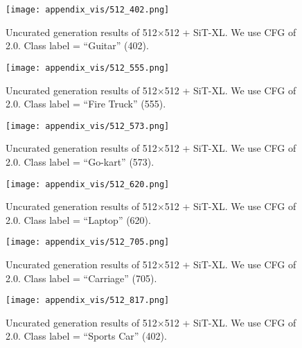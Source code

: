 \begin{figure}[h!]
    \centering
    \texttt{[image: appendix\_vis/512\_402.png]}
    \caption{Uncurated generation results of 512$\times$512 \method + SiT-XL. We use CFG of 2.0. Class label = ``Guitar'' (402).}
\end{figure}

\begin{figure}[h!]
    \centering
    \texttt{[image: appendix\_vis/512\_555.png]}
    \caption{Uncurated generation results of 512$\times$512 \method + SiT-XL. We use CFG of 2.0. Class label = ``Fire Truck'' (555).}
\end{figure}



\begin{figure}[h!]
    \centering
    \texttt{[image: appendix\_vis/512\_573.png]}
    \caption{Uncurated generation results of 512$\times$512 \method + SiT-XL. We use CFG of 2.0. Class label = ``Go-kart'' (573).}
\end{figure}


\begin{figure}[h!]
    \centering
    \texttt{[image: appendix\_vis/512\_620.png]}
    \caption{Uncurated generation results of 512$\times$512 \method + SiT-XL. We use CFG of 2.0. Class label = ``Laptop'' (620).}
\end{figure}


\begin{figure}[h!]
    \centering
    \texttt{[image: appendix\_vis/512\_705.png]}
    \caption{Uncurated generation results of 512$\times$512 \method + SiT-XL. We use CFG of 2.0. Class label = ``Carriage'' (705).}
\end{figure}

\begin{figure}[h!]
    \centering
    \texttt{[image: appendix\_vis/512\_817.png]}
    \caption{Uncurated generation results of 512$\times$512 \method + SiT-XL. We use CFG of 2.0. Class label = ``Sports Car'' (402).}
\end{figure}